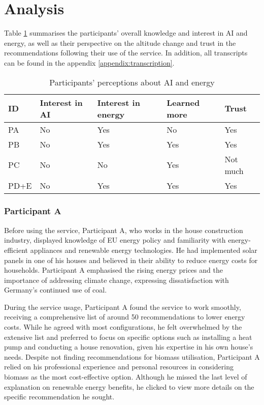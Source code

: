 \section{Analysis}

Table \ref{tab:participants_perceptions} summarises the participants' overall knowledge and interest in AI and energy, 
as well as their perspective on the altitude change and trust in the recommendations following their use of the service.  
In addition, all transcripts can be found in the appendix \ref{appendix:transcription}.

\begin{table}[h!]
  \centering
  \begin{tabular}{ | p{} | p{} | p{} | p{} | p{} | } 
    \hline
    ID & Interest in AI & Interest in energy & Learned more & Trust \\
    \hline
    PA & No & Yes & No & Yes \\
    \hline
    PB & No & Yes & Yes & Yes \\
    \hline
    PC & No & No & Yes & Not much \\
    \hline
    PD+E & No & Yes & Yes & Yes \\
    \hline
  \end{tabular}
  \caption{Participants' perceptions about AI and energy}
  \label{tab:participants_perceptions}
\end{table}


\subsubsection{Participant A}

Before using the service, 
Participant A, who works in the house construction industry, 
displayed knowledge of EU energy policy and familiarity with energy-efficient appliances and renewable energy technologies. 
He had implemented solar panels in one of his houses and believed in their ability to reduce energy costs for households. 
Participant A emphasised the rising energy prices and the importance of addressing climate change, expressing dissatisfaction with Germany's continued use of coal. 

During the service usage, 
Participant A found the service to work smoothly, receiving a comprehensive list of around 50 recommendations to lower energy costs. 
While he agreed with most configurations, he felt overwhelmed by the extensive list and preferred to focus on specific options such as installing a heat pump and conducting a house renovation, given his expertise in his own house's needs. 
Despite not finding recommendations for biomass utilisation, Participant A relied on his professional experience and personal resources in considering biomass as the most cost-effective option. 
Although he missed the last level of explanation on renewable energy benefits, he clicked to view more details on the specific recommendation he sought.

